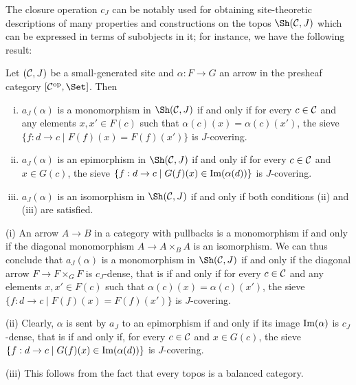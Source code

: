 \documentclass[a4paper,12pt]{article}
\begin{document}
The closure operation $c_{J}$ can be notably used for obtaining site-theoretic descriptions of many properties and constructions on the topos $\Sh({\cal C}, J)$ which can be expressed in terms of subobjects in it; for instance, we have the following result:

\begin{lemma}\label{lemmalift}
	Let $({\cal C}, J)$ be a small-generated site and $\alpha:F\to G$ an arrow in the presheaf category $[{\cal C}^\textup{op}, \Set]$. Then
	\begin{enumerate}[(i)]
		\item $a_{J}(\alpha)$ is a monomorphism in $\Sh({\cal C}, J)$ if and only if for every $c\in {\cal C}$ and any elements $x, x'\in F(c)$ such that $\alpha(c)(x)=\alpha(c)(x')$, the sieve $\{f:d\to c \mid F(f)(x)=F(f)(x')\}$ is $J$-covering.
		
		\item $a_{J}(\alpha)$ is an epimorphism in $\Sh({\cal C}, J)$ if and only if for every $c\in {\cal C}$ and $x\in G(c)$, the sieve $\{f:d\to c \mid G(f)(x)\in \textup{Im}(\alpha(d)) \}$ is $J$-covering. 
		
		\item $a_{J}(\alpha)$ is an isomorphism in $\Sh({\cal C}, J)$ if and only if both conditions (ii) and (iii) are satisfied.
	\end{enumerate}
\end{lemma}

\begin{proofs}
	(i) An arrow $A\to B$ in a category with pullbacks is a monomorphism if and only if the diagonal monomorphism $A\to A\times_{B} A$ is an isomorphism. We can thus conclude that $a_{J}(\alpha)$ is a monomorphism in $\Sh({\cal C}, J)$ if and only if the diagonal arrow $F\to F\times_{G} F$ is $c_{J}$-dense, that is if and only if for every $c\in {\cal C}$ and any elements $x, x'\in F(c)$ such that $\alpha(c)(x)=\alpha(c)(x')$, the sieve $\{f:d\to c \mid F(f)(x)=F(f)(x')\}$ is $J$-covering.  
	
	(ii) Clearly, $\alpha$ is sent by $a_{J}$ to an epimorphism if and only if its image $\textup{Im}(\alpha)$ is $c_{J}$-dense, that is if and only if, for every $c\in {\cal C}$ and $x\in G(c)$, the sieve $\{f:d\to c \mid G(f)(x)\in \textup{Im}(\alpha(d)) \}$ is $J$-covering. 
	
	(iii) This follows from the fact that every topos is a balanced category.
\end{proofs}
\end{document}
